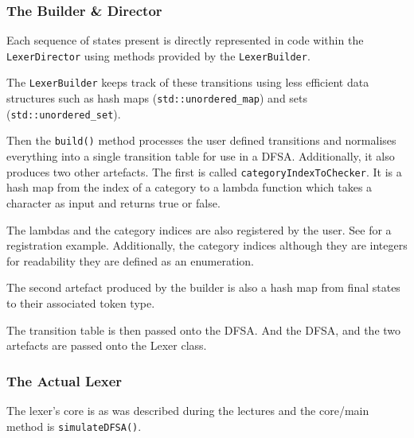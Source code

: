 \subsubsection{The Builder \& Director}

Each sequence of states present is directly
represented in code within the
\texttt{LexerDirector} using methods provided by
the \texttt{LexerBuilder}.



The \texttt{LexerBuilder} keeps track of these
transitions using less efficient data structures
such as hash maps (\texttt{std::unordered\_map})
and sets (\texttt{std::unordered\_set}).

Then the \texttt{build()} method processes the
user defined transitions and normalises everything
into a single transition table for use in a DFSA.
Additionally, it also produces two other
artefacts. The first is called
\texttt{categoryIndexToChecker}. It is a hash map
from the index of a category to a lambda function
which takes a character as input and returns true
or false.

The lambdas and the category indices are also
registered by the user. See 
for a registration example. Additionally, the
category indices although they are integers for
readability they are defined as an enumeration.



The second artefact produced by the builder is
also a hash map from final states to their
associated token type.

The transition table is then passed onto the DFSA.
And the DFSA, and the two artefacts are passed
onto the Lexer class.



\subsubsection{The Actual Lexer}

The lexer's core is as was described during the
lectures and the core/main method is
\texttt{simulateDFSA()}.

